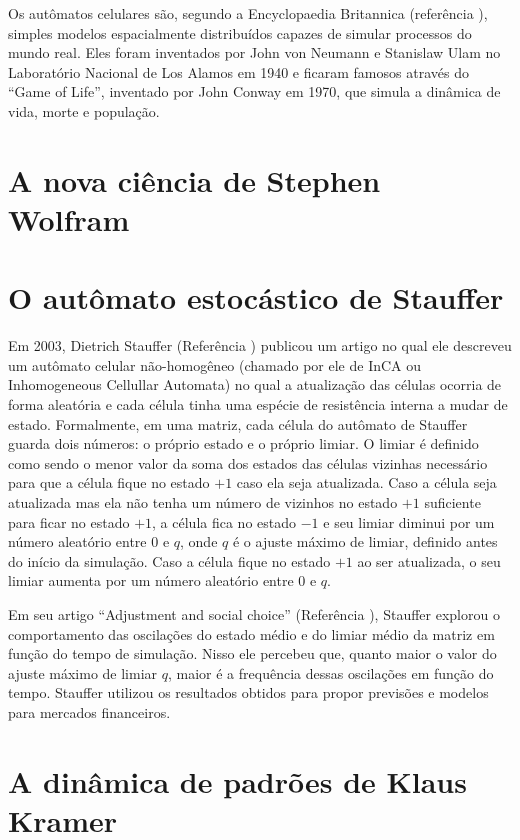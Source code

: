 \documentclass[
	12pt,				%
	openright,			%
	twoside,			%
	a4paper,			%
	english,			%
	french,				%
	spanish,			%
	brazil				%
	]{abntex2}
\begin{document}
Os autômatos celulares são, segundo a Encyclopaedia Britannica (referência \cite{britannica3}), simples modelos espacialmente distribuídos capazes de simular processos do mundo real. Eles foram inventados por John von Neumann e Stanislaw Ulam no Laboratório Nacional de Los Alamos em 1940 e ficaram famosos através do ``Game of Life'', inventado por John Conway em 1970, que simula a dinâmica de vida, morte e população.

\section*{A nova ciência de Stephen Wolfram}

\section*{O autômato estocástico de Stauffer}

Em 2003, Dietrich Stauffer (Referência \cite{stauffer}) publicou um artigo no qual ele descreveu um autômato celular não-homogêneo (chamado por ele de InCA ou Inhomogeneous Cellullar Automata) no qual a atualização das células ocorria de forma aleatória e cada célula tinha uma espécie de resistência interna a mudar de estado. Formalmente, em uma matriz, cada célula do autômato de Stauffer guarda dois números: o próprio estado e o próprio limiar. O limiar é definido como sendo o menor valor da soma dos estados das células vizinhas necessário para que a célula fique no estado $+1$ caso ela seja atualizada. Caso a célula seja atualizada mas ela não tenha um número de vizinhos no estado $+1$ suficiente para ficar no estado $+1$, a célula fica no estado $-1$ e seu limiar diminui por um número aleatório entre $0$ e $q$, onde $q$ é o ajuste máximo de limiar, definido antes do início da simulação. Caso a célula fique no estado $+1$ ao ser atualizada, o seu limiar aumenta por um número aleatório entre $0$ e $q$.

Em seu artigo ``Adjustment and social choice'' (Referência \cite{stauffer}), Stauffer explorou o comportamento das oscilações do estado médio e do limiar médio da matriz em função do tempo de simulação. Nisso ele percebeu que, quanto maior o valor do ajuste máximo de limiar $q$, maior é a frequência dessas oscilações em função do tempo. Stauffer utilizou os resultados obtidos para propor previsões e modelos para mercados financeiros.

\section*{A dinâmica de padrões de Klaus Kramer}
\end{document}
